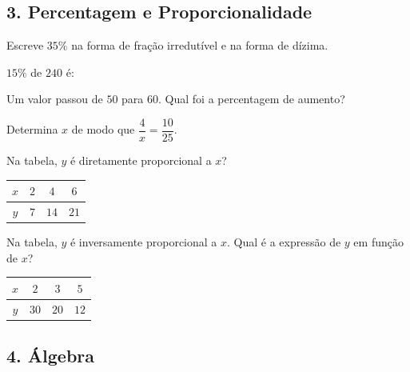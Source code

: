\documentclass[12pt,a4paper]{article}
\begin{document}
\subsection*{3. Percentagem e Proporcionalidade}

\begin{questoes}[resume]
    \item Escreve $35\%$ na forma de fração irredutível
    e na forma de dízima.

    \item $15\%$ de $240$ é:

    \item Um valor passou de $50$ para $60$.
    Qual foi a percentagem de aumento?

    \item Determina $x$ de modo que
    $\dfrac{4}{x} = \dfrac{10}{25}$.

    \item Na tabela, $y$ é diretamente proporcional a $x$?

    \begin{tabular}{|c|c|c|c|}
        \hline
        $x$ & $2$ & $4$ & $6$ \\
        \hline
        $y$ & $7$ & $14$ & $21$ \\
        \hline
    \end{tabular}


    \item Na tabela, $y$ é inversamente proporcional a $x$.
    Qual é a expressão de $y$ em função de $x$?

    \begin{tabular}{|c|c|c|c|}
        \hline
        $x$ & $2$ & $3$ & $5$ \\
        \hline
        $y$ & $30$ & $20$ & $12$ \\
        \hline
    \end{tabular}

\end{questoes}

\subsection*{4. Álgebra}
\end{document}
